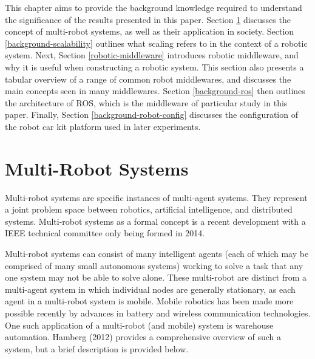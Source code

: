 \documentclass[../dissertation.tex]{subfiles}
\begin{document}
This chapter aims to provide the background knowledge required to understand the significance of the results presented in this paper. Section \ref{section-multi-robot-systems} discusses the concept of multi-robot systems, as well as their application in society. Section \ref{background-scalability} outlines what scaling refers to in the context of a robotic system. Next, Section \ref{robotic-middleware} introduces robotic middleware, and why it is useful when constructing a robotic system. This section also presents a tabular overview of a range of common robot middlewares, and discusses the main concepts seen in many middlewares. Section \ref{background-ros} then outlines the architecture of ROS, which is the middleware of particular study in this paper. Finally, Section \ref{background-robot-config} discusses the configuration of the robot car kit platform used in later experiments.

\section{Multi-Robot Systems}
\label{section-multi-robot-systems}

Multi-robot systems are specific instances of multi-agent systems. They represent a joint problem space between robotics, artificial intelligence, and distributed systems. Multi-robot systems as a formal concept is a recent development with a IEEE technical committee only being formed in 2014\cite{MultiRobotSystemsIEEECommittee}.

Multi-robot systems can consist of many intelligent agents (each of which may be comprised of many small autonomous systems) working to solve a task that any one system may not be able to solve alone. These multi-robot are distinct from a multi-agent system in which individual nodes are generally stationary, as each agent in a multi-robot system is mobile\cite{doi:10.5772/57313}. Mobile robotics has been made more possible recently by advances in battery\cite{estrin2002connecting} and wireless communication\cite{cordeiro2010ieee} technologies. One such application of a multi-robot (and mobile) system is warehouse automation. Hamberg (2012)\cite{hamberg2012automation} provides a comprehensive overview of such a system, but a brief description is provided below.
\end{document}
